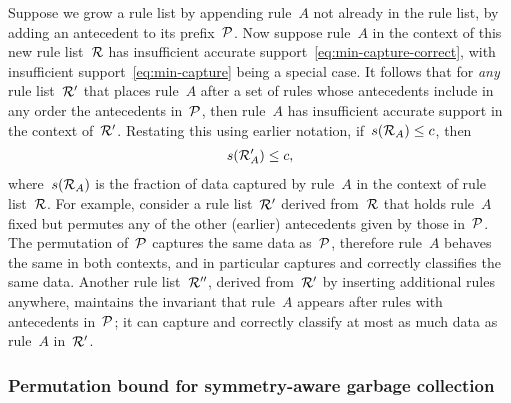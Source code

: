 Suppose we grow a rule list by appending rule~$A$ not already in the rule list,
\ie by adding an antecedent to its prefix~${\mathcal P}$.
%
Now suppose rule~$A$ in the context of this new rule list~${\mathcal R}$ has
insufficient accurate support~\eqref{eq:min-capture-correct},
with insufficient support~\eqref{eq:min-capture} being a special case.
%
It follows that for \emph{any} rule list~${\mathcal R}'$ that places rule~$A$ after
a set of rules whose antecedents include in any order the antecedents in~${\mathcal P}$,
then rule~$A$ has insufficient accurate support in the context of~${\mathcal R}'$.
%
Restating this using earlier notation, if~${s({\mathcal R}_A) \le c}$, then
\begin{align}
s(\RL'_A) \le c,
\end{align}
where~$s({\mathcal R}_A)$ is the fraction of data captured by rule~$A$ in the context of rule list~${\mathcal R}$.
%
For example, consider a rule list~${\mathcal R}'$ derived from~${\mathcal R}$ that holds rule~$A$ fixed
but permutes any of the other (earlier) antecedents given by those in~${\mathcal P}$.
%
The permutation of~${\mathcal P}$ captures the same data as~${\mathcal P}$,
therefore rule~$A$ behaves the same in both contexts,
and in particular captures and correctly classifies the same data.
%
Another rule list~${\mathcal R}''$, derived from~${\mathcal R}'$ by inserting additional rules anywhere,
maintains the invariant that rule~$A$ appears after rules with antecedents in~${\mathcal P}$;
it can capture and correctly classify at most as much data as rule~$A$ in~${\mathcal R}'$.
%

\subsubsection{Permutation bound for symmetry-aware garbage collection}

